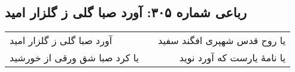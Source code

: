 \begin{center}
\section*{رباعی شماره ۳۰۵: آورد صبا گلی ز گلزار امید}
\label{sec:sh305}
\begin{longtable}{l p{0.5cm} r}
آورد صبا گلی ز گلزار امید
&&
یا روح قدس شهپری افگند سفید
\\
یا کرد صبا شق ورقی از خورشید
&&
یا نامهٔ یارست که آورد نوید
\\
\end{longtable}
\end{center}
